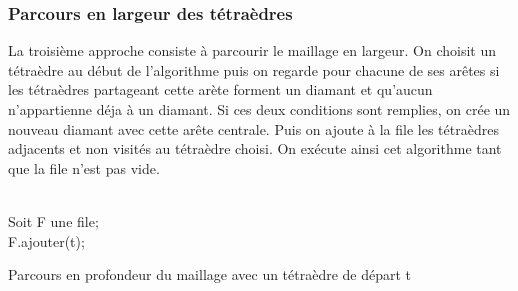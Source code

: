 \subsubsection{Parcours en largeur des tétraèdres}
\label{parcours_largeur}
\noindent
La troisième approche consiste à parcourir le maillage en largeur. On choisit un tétraèdre au début de l'algorithme puis on regarde pour chacune de ses arêtes si les tétraèdres partageant cette arète forment un diamant et qu'aucun n'appartienne déja à un diamant. Si ces deux conditions sont remplies, on crée un nouveau diamant avec cette arête centrale. Puis on ajoute à la file les tétraèdres adjacents et non visités au tétraèdre choisi. On exécute ainsi cet algorithme tant que la file n'est pas vide.\\\\
\begin{algorithm}[th]
\SetAlgoLined	
 Soit F une file;\\
 F.ajouter(t);\\
 \caption{Parcours en profondeur du maillage avec un tétraèdre de départ t}
\end{algorithm}

